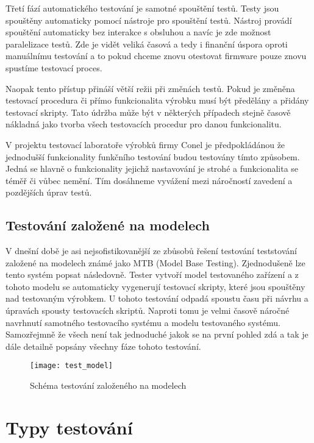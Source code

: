 Třetí fází automatického testování je samotné spouštění testů. Testy jsou spouštěny automaticky pomocí nástroje pro spouštění testů. Nástroj provádí spouštění automaticky bez interakce s obsluhou a navíc je zde možnost paralelizace testů. Zde je vidět veliká časová a tedy i finanční úspora oproti manuálnímu testování a to pokud chceme znovu otestovat firmware pouze znovu spustíme testovací proces.

Naopak tento přístup přináší větší režii při změnách testů. Pokud je změněna testovací procedura či přímo funkcionalita výrobku musí být předělány a přidány testovací skripty. Tato údržba může být v některých případech stejně časově nákladná jako tvorba všech testovacích procedur pro danou funkcionalitu.

V projektu testovací laboratoře výrobků firmy Conel je předpokládánou že jednodušší funkcionality funkčního testování budou testovány tímto způsobem. Jedná se hlavně o funkcionality jejichž nastavování je strohé a funkcionalita se téměř či vůbec nemění. Tím dosáhneme vyvážení mezi náročností zavedení a pozdějších úprav testů.

\subsection{Testování založené na modelech}
V dnešní době je asi nejsofistikovanější ze zbůsobů řešení testování teststování založené na modelech známé jako MTB (Model Base Testing). Zjednodušeně lze tento systém popsat následovně. Tester vytvoří model testovaného zařízení a z tohoto modelu se automaticky vygenerují testovací skripty, které jsou spouštěny nad testovaným výrobkem. U tohoto testování odpadá spoustu času při návrhu a úpravách spousty testovacích skriptů. Naproti tomu je velmi časově náročné navrhnutí samotného testovacího systému a modelu testovaného systému. Samozřejmně že všech není tak jednoduché jakok se na první pohled zdá a tak je dále detailně popsány všechny fáze tohoto testování.

\begin{figure}[h]
  \centering
  \texttt{[image: test\_model]}
  \caption{Schéma testování založeného na modelech}
  \label{fig:test_model}
\end{figure}



\section{Typy testování}

